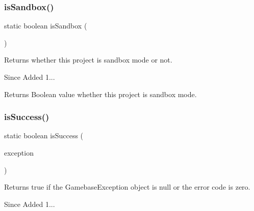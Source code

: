 \subsubsection{\texorpdfstring{is\+Sandbox()}{isSandbox()}}
{\footnotesize\ttfamily static boolean is\+Sandbox (\begin{DoxyParamCaption}{ }\end{DoxyParamCaption})\hspace{0.3cm}{\ttfamily [static]}}



Returns whether this project is sandbox mode or not. 

\begin{DoxySince}{Since}
Added 1... 
\end{DoxySince}
\begin{DoxyReturn}{Returns}
Boolean value whether this project is sandbox mode. 
\end{DoxyReturn}
\mbox{\label{classcom_1_1toast_1_1android_1_1gamebase_1_1_gamebase_ae28caa0bc9c72de9cc018ee36eb25b47}} 
\subsubsection{\texorpdfstring{is\+Success()}{isSuccess()}}
{\footnotesize\ttfamily static boolean is\+Success (\begin{DoxyParamCaption}\item[{@Nullable final \hyperlink{classcom_1_1toast_1_1android_1_1gamebase_1_1base_1_1_gamebase_exception}{Gamebase\+Exception}}]{exception }\end{DoxyParamCaption})\hspace{0.3cm}{\ttfamily [static]}}



Returns true if the Gamebase\+Exception object is null or the error code is zero. 

\begin{DoxySince}{Since}
Added 1... 
\end{DoxySince}


